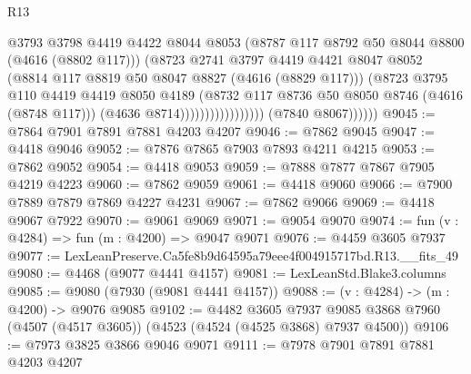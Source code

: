 \begin{lexlean}{R13}
\begin{coremodule}
                                          @3793
                                          @3798
                                          @4419
                                          @4422
                                          @8044
                                          @8053
                                          (@8787 @117 @8792 @50 @8044 @8800 (@4616 (@8802 @117)))
                                          (@8723
                                            @2741
                                            @3797
                                            @4419
                                            @4421
                                            @8047
                                            @8052
                                            (@8814 @117 @8819 @50 @8047 @8827 (@4616 (@8829 @117)))
                                            (@8723
                                              @3795
                                              @110
                                              @4419
                                              @4419
                                              @8050
                                              @4189
                                              (@8732
                                                @117
                                                @8736
                                                @50
                                                @8050
                                                @8746
                                                (@4616 (@8748 @117)))
                                              (@4636 @8714)))))))))))))))))
              (@7840 @8067))))))
@9045 := @7864 @7901 @7891 @7881 @4203 @4207
@9046 := @7862 @9045
@9047 := @4418 @9046
@9052 := @7876 @7865 @7903 @7893 @4211 @4215
@9053 := @7862 @9052
@9054 := @4418 @9053
@9059 := @7888 @7877 @7867 @7905 @4219 @4223
@9060 := @7862 @9059
@9061 := @4418 @9060
@9066 := @7900 @7889 @7879 @7869 @4227 @4231
@9067 := @7862 @9066
@9069 := @4418 @9067 @7922
@9070 := @9061 @9069
@9071 := @9054 @9070
@9074 := fun (v : @4284) => fun (m : @4200) => @9047 @9071
@9076 := @4459 @3605 @7937
@9077 := LexLeanPreserve.Ca5fe8b9d64595a79eee4f004915717bd.R13.__fits_49
@9080 := @4468 (@9077 @4441 @4157)
@9081 := LexLeanStd.Blake3.columns
@9085 := @9080 (@7930 (@9081 @4441 @4157))
@9088 := (v : @4284) -> (m : @4200) -> @9076 @9085
@9102 := @4482
    @3605
    @7937
    @9085
    @3868
    @7960
    (@4507 (@4517 @3605))
    (@4523 (@4524 (@4525 @3868) @7937 @4500))
@9106 := @7973 @3825 @3866 @9046 @9071
@9111 := @7978 @7901 @7891 @7881 @4203 @4207

\end{coremodule}
\end{lexlean}

